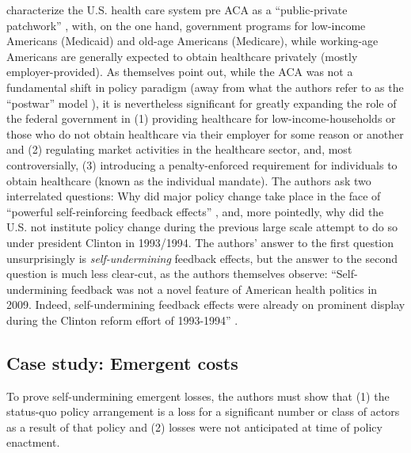 \documentclass[11pt]{article}
\begin{document}
\textcite[][]{Jacobs2014} characterize the U.S. health care system pre ACA as a \enquote{public-private patchwork} , with, on the one hand, government programs for low-income Americans (Medicaid) and old-age Americans (Medicare), while working-age Americans are generally expected to obtain healthcare privately (mostly employer-provided). As \textcite[][]{Jacobs2014} themselves point out, while the ACA was not a fundamental shift in policy paradigm (away from what the authors refer to as the \enquote{postwar} model ), it is nevertheless significant for greatly expanding the role of the federal government in (1) providing healthcare for low-income-households or those who do not obtain healthcare via their employer for some reason or another and (2) regulating market activities in the healthcare sector, and, most controversially, (3) introducing a penalty-enforced requirement for individuals to obtain healthcare (known as the individual mandate). The authors ask two interrelated questions: Why did major policy change take place in the face of \enquote{powerful self-reinforcing feedback effects} \parencite[][p. 451]{Jacobs2014}, and, more pointedly, why did the U.S. not institute policy change during the previous large scale attempt to do so under president Clinton in 1993/1994. The authors' answer to the first question unsurprisingly is \textit{self-undermining} feedback effects, but the answer to the second question is much less clear-cut, as the authors themselves observe: \enquote{Self-undermining feedback was not a novel feature of American health politics in 2009. Indeed, self-undermining feedback effects were already on prominent display during the Clinton reform effort of 1993-1994} \parencite[][p. 451]{Jacobs2014}.

\subsection*{Case study: Emergent costs}

To prove self-undermining emergent losses, the authors must show that (1) the status-quo policy arrangement is a loss for a significant number or class of actors as a result of that policy and (2) losses were not anticipated at time of policy enactment.

\begin{figure}[H]
  \sffamily
  
  \label{fig:eci}
\end{figure}
\end{document}
